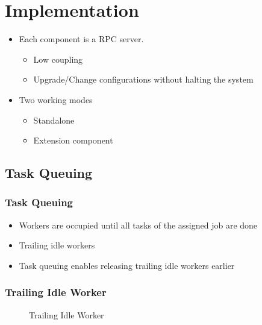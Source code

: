 \section{Implementation}
\begin{frame}
  \begin{itemize}
    \item Each component is a RPC server.
      \begin{itemize}
        \item Low coupling
        \item Upgrade/Change configurations without halting the system
      \end{itemize}
    \item Two working modes
      \begin{itemize}
        \item Standalone
        \item Extension component
      \end{itemize}
  \end{itemize}
\end{frame}
\subsection{Task Queuing}
\begin{frame}
  \frametitle{Task Queuing}
  \begin{itemize}
    \item Workers are occupied until all tasks of the assigned job are
      done
    \item Trailing idle workers
    \item Task queuing enables releasing trailing idle workers earlier
  \end{itemize}
\end{frame}

\begin{frame}
  \frametitle{Trailing Idle Worker}

  \begin{figure}[h]
    \centering
    \resizebox{\textheight}{!}{
      
    }
    \caption{Trailing Idle Worker}
  \end{figure}
\end{frame}

